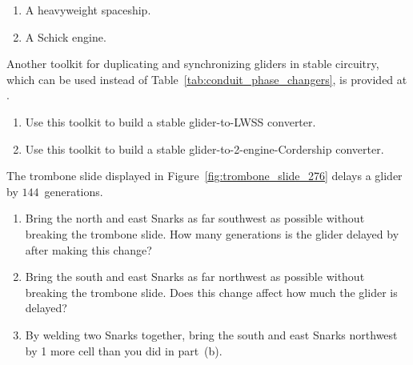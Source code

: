 \begin{multicols}{2}
\begin{problem}
\begin{enumerate}[label=\bf\color{ocre}(\alph*)]
			\item A heavyweight spaceship.
			
			\item A Schick engine. %
		\end{enumerate}
	\end{problem}


	\mfilbreak
	
	
	\begin{problem}\label{exer:other_toolkit_stable_conduits}
		Another toolkit for duplicating and synchronizing gliders in stable circuitry, which can be used instead of Table~\ref{tab:conduit_phase_changers}, is provided at . \smallskip
		
		\begin{enumerate}[label=\bf\color{ocre}(\alph*)]
			\item {} Use this toolkit to build a stable glider-to-LWSS converter.
			
			\item {} Use this toolkit to build a stable glider-to-2-engine-Cordership converter.
		\end{enumerate}
	\end{problem}


\mfilbreak


\begin{problem}\label{exer:faster_trombone_slide}
The trombone slide displayed in Figure~\ref{fig:trombone_slide_276} delays a glider by $144$~generations.\smallskip

\begin{enumerate}[label=\bf\color{ocre}(\alph*)]
	\item {} Bring the north and east Snarks as far southwest as possible without breaking the trombone slide. How many generations is the glider delayed by after making this change?
	\item {} Bring the south and east Snarks as far northwest as possible without breaking the trombone slide. Does this change affect how much the glider is delayed?
	
	\item {} By welding two Snarks together, bring the south and east Snarks northwest by 1 more cell than you did in part~(b).
\end{enumerate}
\end{problem}



\end{multicols}
